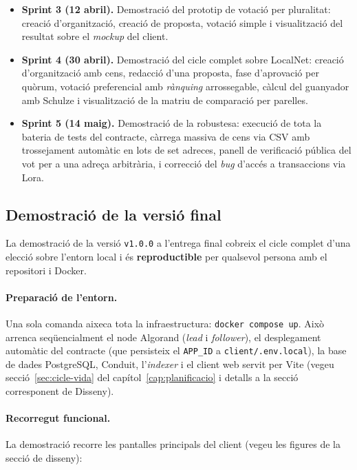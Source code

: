 \begin{itemize}
    \item \textbf{Sprint 3 (12 abril).} Demostració del prototip de
    votació per pluralitat: creació d'organització, creació de
    proposta, votació simple i visualització del resultat sobre el
    \emph{mockup} del client.

    \item \textbf{Sprint 4 (30 abril).} Demostració del cicle complet
    sobre LocalNet: creació d'organització amb cens, redacció d'una
    proposta, fase d'aprovació per quòrum, votació preferencial amb
    \emph{rànquing} arrossegable, càlcul del guanyador amb Schulze i
    visualització de la matriu de comparació per parelles.

    \item \textbf{Sprint 5 (14 maig).} Demostració de la robustesa:
    execució de tota la bateria de tests del contracte, càrrega
    massiva de cens via \ac{CSV} amb trossejament automàtic en lots
    de set adreces, panell de verificació pública del vot per a una
    adreça arbitrària, i correcció del \emph{bug} d'accés a
    transaccions via Lora.
\end{itemize}

\subsection{Demostració de la versió final}
\label{sec:demo-final}

La demostració de la versió \texttt{v1.0.0} a l'entrega final cobreix
el cicle complet d'una elecció sobre l'entorn local i és
\textbf{reproductible} per qualsevol persona amb el repositori i
Docker.

\paragraph{Preparació de l'entorn.} Una sola comanda aixeca tota la
infraestructura: \texttt{docker compose up}. Això arrenca
seqüencialment el node Algorand (\emph{lead} i \emph{follower}), el
desplegament automàtic del contracte (que persisteix el \texttt{APP\_ID}
a \texttt{client/.env.local}), la base de dades PostgreSQL, Conduit,
l'\emph{indexer} i el client web servit per Vite (vegeu
secció~\ref{sec:cicle-vida} del capítol~\ref{cap:planificacio} i
detalls a la secció corresponent de Disseny).

\paragraph{Recorregut funcional.} La demostració recorre les pantalles
principals del client (vegeu les figures de la secció de disseny):

